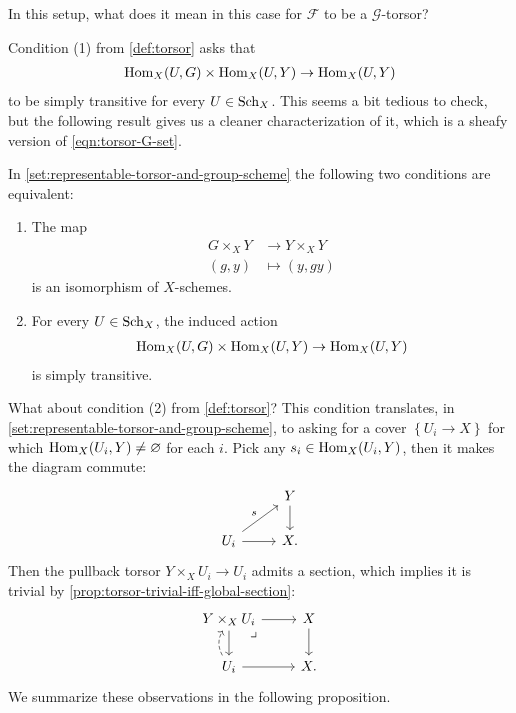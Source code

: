 \documentclass[11pt,openany]{book}
\begin{document}
In this setup, what does it mean in this case for $\mathcal{F}$ to be a $\mathcal{G}$-torsor?

Condition (1) from \autoref{def:torsor} asks that
\begin{align*}
    \mathrm{Hom}_X(U,G) \times \mathrm{Hom}_X(U,Y) \to \mathrm{Hom}_X(U,Y)
\end{align*}
to be simply transitive for every $U\in \mathrm{Sch}_X$. This seems a bit tedious to check, but the following result gives us a cleaner characterization of it, which is a sheafy version of \autoref{eqn:torsor-G-set}.

\begin{proposition} \cite[0499]{Stacks} In \autoref{set:representable-torsor-and-group-scheme} the following two conditions are equivalent:
\begin{enumerate}
    \item The map
    \begin{align*}
        G \times_X Y &\to Y \times_X Y \\
        (g,y) &\mapsto (y,gy)
    \end{align*}
    is an isomorphism of $X$-schemes.
    
    \item For every $U \in \mathrm{Sch}_X$, the induced action
    \begin{align*}
        \mathrm{Hom}_X(U,G) \times \mathrm{Hom}_X(U,Y) \to \mathrm{Hom}_X(U,Y)
    \end{align*}
    is simply transitive.
\end{enumerate}
\end{proposition}

What about condition (2) from \autoref{def:torsor}? This condition translates, in \autoref{set:representable-torsor-and-group-scheme}, to asking for a cover $\left\{ U_i \to X \right\}$ for which $\mathrm{Hom}_X(U_i,Y)\ne \varnothing$ for each $i$. Pick any $s_i \in \mathrm{Hom}_X(U_i,Y)$, then it makes the diagram commute:
\[ \begin{tikzcd}
     & Y\dar\\
    U_i\rar\ar[ur,"s" above left] & X.
\end{tikzcd} \]
Then the pullback torsor $Y \times_X U_i \to U_i$ admits a section, which implies it is trivial by \autoref{prop:torsor-trivial-iff-global-section}:
\[ \begin{tikzcd}
    Y\times_X U_i\dar\rar\pb & X\dar\\
    U_i\rar\uar[dashed,bend left=30] & X.
\end{tikzcd} \]
%
We summarize these observations in the following proposition.
\end{document}
